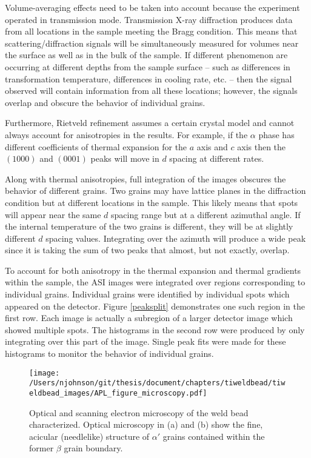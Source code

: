 Volume-averaging effects need to be taken into account because the experiment operated in transmission mode. Transmission X-ray diffraction produces data from all locations in the sample meeting the Bragg condition. This means that scattering/diffraction signals will be simultaneously measured for volumes near the surface as well as in the bulk of the sample. If different phenomenon are occurring at different depths from the sample surface -- such as differences in transformation temperature, differences in cooling rate, etc. -- then the signal observed will contain information from all these locations; however, the signals overlap and obscure the behavior of individual grains.

Furthermore, Rietveld refinement assumes a certain crystal model and cannot always account for anisotropies in the results. For example, if the $\alpha$ phase has different coefficients of thermal expansion for the $a$ axis and $c$ axis then the $\left(1000\right)$ and $\left(0001\right)$ peaks will move in $d$ spacing at different rates.

Along with thermal anisotropies, full integration of the images obscures the behavior of different grains. Two grains may have lattice planes in the diffraction condition but at different locations in the sample. This likely means that spots will appear near the same $d$ spacing range but at a different azimuthal angle. If the internal temperature of the two grains is different, they will be at slightly different $d$ spacing values. Integrating over the azimuth will produce a wide peak since it is taking the sum of two peaks that almost, but not exactly, overlap.

To account for both anisotropy in the thermal expansion and thermal gradients within the sample, the ASI images were integrated over regions corresponding to individual grains. Individual grains were identified by individual spots which appeared on the detector. Figure \ref{peaksplit} demonstrates one such region in the first row. Each image is actually a subregion of a larger detector image which showed multiple spots. The histograms in the second row were produced by only integrating over this part of the image. Single peak fits were made for these histograms to monitor the behavior of individual grains.

\begin{figure}
    \centering
    \texttt{[image: /Users/njohnson/git/thesis/document/chapters/tiweldbead/tiweldbead\_images/APL\_figure\_microscopy.pdf]}
    \caption{Optical and scanning electron microscopy of the weld bead characterized. Optical microscopy in (a) and (b) show the fine, acicular (needlelike) structure of $\alpha'$ grains contained within the former $\beta$ grain boundary. }
    \label{microscopy}
\end{figure} 

